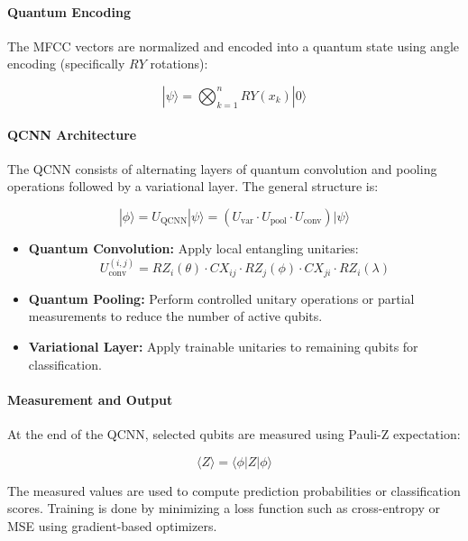 \documentclass[conference]{IEEEtran}
\begin{document}
\paragraph{Quantum Encoding}

The MFCC vectors are normalized and encoded into a quantum state using angle encoding (specifically \( RY \) rotations):

\begin{equation}
    |\psi\rangle = \bigotimes_{k=1}^{n} RY(x_k) |0\rangle
\end{equation}

\paragraph{QCNN Architecture}

The QCNN consists of alternating layers of quantum convolution and pooling operations followed by a variational layer. The general structure is:

\begin{equation}
    |\phi\rangle = U_{\text{QCNN}} |\psi\rangle = (U_{\text{var}} \cdot U_{\text{pool}} \cdot U_{\text{conv}}) |\psi\rangle
\end{equation}

\begin{itemize}
    \item \textbf{Quantum Convolution:} Apply local entangling unitaries:
          \[
              U^{(i,j)}_{\text{conv}} = RZ_i(\theta) \cdot CX_{ij} \cdot RZ_j(\phi) \cdot CX_{ji} \cdot RZ_i(\lambda)
          \]
    \item \textbf{Quantum Pooling:} Perform controlled unitary operations or partial measurements to reduce the number of active qubits.
    \item \textbf{Variational Layer:} Apply trainable unitaries to remaining qubits for classification.
\end{itemize}

\paragraph{Measurement and Output}

At the end of the QCNN, selected qubits are measured using Pauli-Z expectation:

\begin{equation}
    \langle Z \rangle = \langle \phi | Z | \phi \rangle
\end{equation}

The measured values are used to compute prediction probabilities or classification scores. Training is done by minimizing a loss function such as cross-entropy or MSE using gradient-based optimizers.



\end{document}
